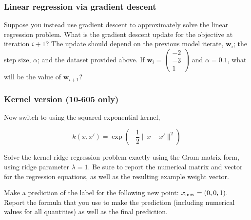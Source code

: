 \begin{answer_box}[title=,height=7cm,width=16.5cm]  
    
\end{answer_box}


\subsubsection{Linear regression via gradient descent }
Suppose you instead use gradient descent to approximately solve the linear regression problem. What is the gradient descent update for the objective at iteration $i+1$? The update should depend on the previous model iterate, $\mathbf{w}_{i}$; the step size, $\alpha$; and the dataset provided above. If $\mathbf{w}_{i} = \begin{pmatrix}
        -2 \\ -3 \\ 1
    \end{pmatrix}$ and $\alpha = 0.1$, what will be the value of $\mathbf{w}_{i+1}$?

\begin{answer_box}[title=,height=7cm,width=16.5cm]  
    
\end{answer_box}

\subsubsection{Kernel version (10-605 only) }

Now switch to using the squared-exponential kernel, 

$$\textstyle k(x,x') =  \exp(-\frac 12\|x-x'\|^2)$$

Solve the kernel ridge regression problem exactly using the Gram matrix form, using ridge parameter $\lambda=1$. Be sure to report the numerical matrix and vector for the regression equations, as well as the resulting example weight vector.

Make a prediction of the label for the following new point: $x_{\rm new} = (0, 0, 1)$. Report the formula that you use to make the prediction (including numerical values for all quantities) as well as the final prediction.

\begin{answer_box}[title=,height=7cm,width=16.5cm]  
    
\end{answer_box}


